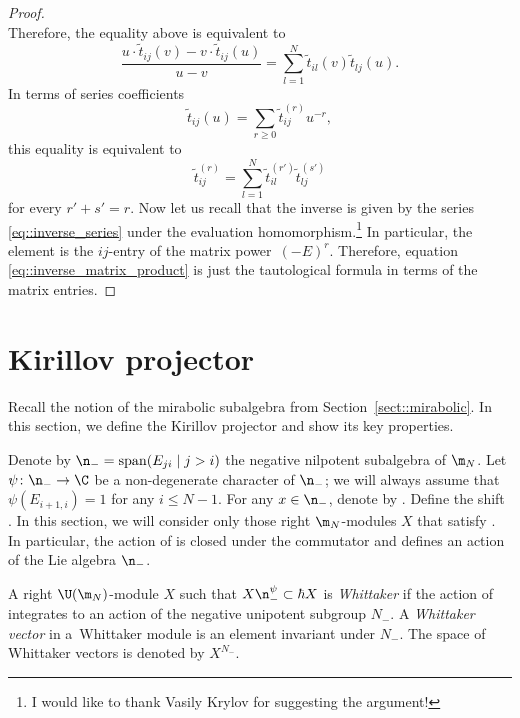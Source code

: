 \begin{Proposition}
\begin{proof}
\[			\]
			Therefore, the equality above is equivalent to
			\[
			\frac{u\cdot \tilde{t}_{ij}(v) - v \cdot \tilde{t}_{ij}(u)}{u-v} = \sum\limits_{l=1}^N \tilde{t}_{il}(v) \tilde{t}_{lj}(u).
			\]
			In terms of series coefficients
			\[
			\tilde{t}_{ij}(u) = \sum\limits_{r\geq 0} \tilde{t}_{ij}^{(r)} u^{-r},
			\]
			this equality is equivalent to
			\begin{equation}
				\label{eq::inverse_matrix_product}
				\tilde{t}_{ij}^{(r)} = \sum\limits_{l=1}^{N} \tilde{t}_{il}^{(r')} \tilde{t}_{lj}^{(s')}
			\end{equation}
			for every $r' + s' = r$. Now let us recall that the inverse is given by the series \eqref{eq::inverse_series} under the evaluation homomorphism.\footnote{I would like to thank Vasily Krylov for suggesting the argument!} In particular, the element  is the $ij$-entry of the matrix power~$(-E)^r$. Therefore, equation \eqref{eq::inverse_matrix_product} is just the tautological formula  in terms of the matrix entries.
		\end{proof}
	\end{Proposition}
	
	\section{Kirillov projector}
	\label{sect::kirillov_projector}
	Recall the notion of the mirabolic subalgebra from Section~\ref{sect::mirabolic}. In this section, we define the Kirillov projector and show its key properties.
	
	Denote by $\n_- = \mathrm{span}(E_{ji}\mid j>i) $ the negative nilpotent subalgebra of $\m_N$. Let $\psi\colon \n_- \rightarrow \C$ be a non-degenerate character of $\n_-$; we will always assume that $\psi(E_{i+1,i}) = 1$ for any $i\leq N-1$. For any $x\in \n_-$, denote by . Define the shift . In this section, we will consider only those right $\m_N$-modules $X$ that satisfy . In particular, the action of  is closed under the commutator and defines an action of the Lie algebra $\n_-$.
	
	\begin{Definition}
		\label{def::whittaker_module}
		A right $\U(\m_N)$-module $X$ such that $X\n_-^{\psi} \subset \hbar X$ is \emph{Whittaker} if the action of~ integrates to an action of the negative unipotent subgroup $N_-$. A \emph{Whittaker vector} in a~Whittaker module is an element invariant under $N_-$. The space of Whittaker vectors is denoted by $X^{N_-}$.
	\end{Definition}
	
